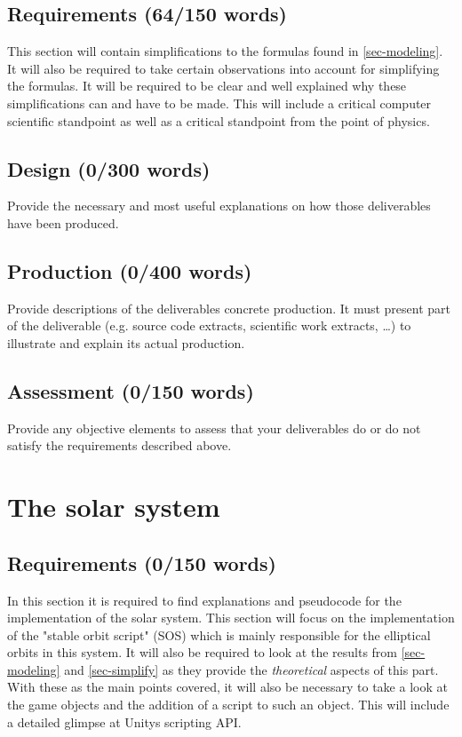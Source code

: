 \documentclass[conference,compsoc]{IEEEtran}
\begin{document}
\subsection{Requirements (64/150 words)}
This section will contain simplifications to the formulas found in \ref{sec-modeling}.\\
It will also be required to take certain observations into account for simplifying the formulas. It will be required to be clear and well explained why these simplifications can and have to be made. This will include a critical computer scientific standpoint as well as a critical standpoint from the point of physics.
\subsection{Design (0/300 words)}
Provide the necessary and most useful explanations on how those deliverables have been produced.
\subsection{Production (0/400 words)}
Provide descriptions of the deliverables concrete production. It must present part of the deliverable (e.g. source code extracts, scientific work extracts, \ldots) to illustrate and explain its actual production.
\subsection{Assessment (0/150 words)}
Provide any objective elements to assess that your deliverables do or do not satisfy the requirements described above. 

\section{The solar system}
\label{sec-solar system}
\subsection{Requirements (0/150 words)}
In this section it is required to find explanations and pseudocode for the implementation of the solar system. This section will focus on the implementation of the "stable orbit script" (SOS) which is mainly responsible for the elliptical orbits in this system. It will also be required to look at the results from \ref{sec-modeling} and \ref{sec-simplify} as they provide the \emph{theoretical} aspects of this part. With these as the main points covered, it will also be necessary to take a look at the game objects and the addition of a script to such an object. This will include a detailed glimpse at Unitys scripting API. 
\end{document}
